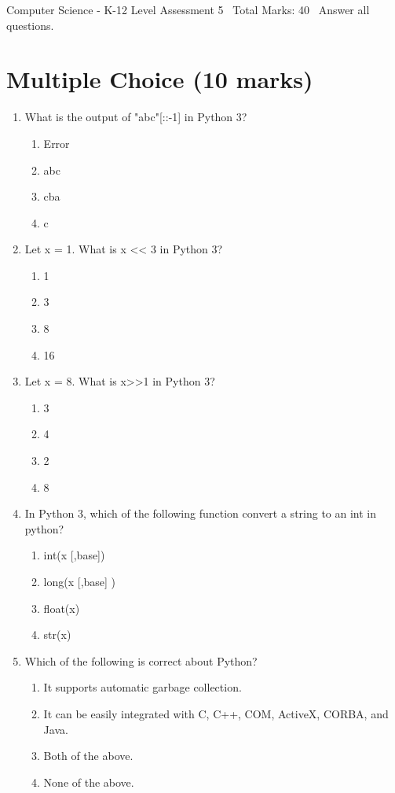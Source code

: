\documentclass[12pt]{article}
\begin{document}
\begin{center}
Computer Science - K-12 Level Assessment 5 \
Total Marks: 40 \
Answer all questions.
\end{center}

\section*{Multiple Choice (10 marks)}
\begin{enumerate}[label=\arabic*.]
\item What is the output of "abc"[::-1] in Python 3?
\begin{enumerate}[label=(\alph*)]
    \item Error
    \item abc
    \item cba
    \item c
\end{enumerate}
\item Let x = 1. What is x \textless{}\textless{} 3 in Python 3?
\begin{enumerate}[label=(\alph*)]
    \item 1
    \item 3
    \item 8
    \item 16
\end{enumerate}
\item Let x = 8. What is x\textgreater{}\textgreater{}1 in Python 3?
\begin{enumerate}[label=(\alph*)]
    \item 3
    \item 4
    \item 2
    \item 8
\end{enumerate}
\item In Python 3, which of the following function convert a string to an int in python?
\begin{enumerate}[label=(\alph*)]
    \item int(x [,base])
    \item long(x [,base] )
    \item float(x)
    \item str(x)
\end{enumerate}
\item Which of the following is correct about Python?
\begin{enumerate}[label=(\alph*)]
    \item It supports automatic garbage collection.
    \item It can be easily integrated with C, C++, COM, ActiveX, CORBA, and Java.
    \item Both of the above.
    \item None of the above.
\end{enumerate}
\end{enumerate}
\end{document}
